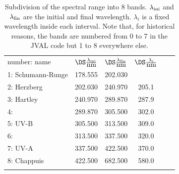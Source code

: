 \documentclass[a4paper,twoside]{article}
\newcommand{\middlehline}{\noalign{\vspace{1mm}}\hline\noalign{\vspace{1mm}}}
\newcommand{\bottomhline}{\noalign{\vspace{1mm}}\hline}
\begin{document}
\begin{table}
  \begin{center}
    \caption{Subdivision of the spectral range into 8 bands.
      $\lambda_{\rm ini}$ and $\lambda_{\rm fin}$ are the initial and
      final wavelength. $\lambda_i$ is a fixed wavelength inside each
      interval. Note that, for historical reasons, the bands are
      numbered from 0 to 7 in the JVAL code but 1 to 8 everywhere else.}
    \label{tab:eightbands}
    \begin{tabular}{lccccc}
      \middlehline
      number: name & 
      $\DS\frac{\lambda_{\rm ini}}{\mbox{nm}}$ & 
      $\DS\frac{\lambda_{\rm fin}}{\mbox{nm}}$ &
      $\DS\frac{\lambda_i}{\mbox{nm}}$\\
      \middlehline
      1: Schumann-Runge & 178.555 & 202.030 & \\
      2: Herzberg       & 202.030 & 240.970 & 205.1\\
      3: Hartley        & 240.970 & 289.870 & 287.9\\
      4:                & 289.870 & 305.500 & 302.0\\
      5: UV-B           & 305.500 & 313.500 & 309.0\\
      6:                & 313.500 & 337.500 & 320.0\\
      7: UV-A           & 337.500 & 422.500 & 370.0\\
      8: Chappuis       & 422.500 & 682.500 & 580.0\\
      \bottomhline
    \end{tabular}
  \end{center}
\end{table}
\end{document}
